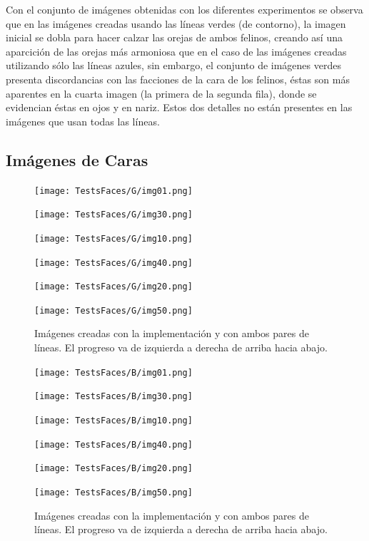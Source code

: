 \documentclass[conference]{IEEEtran}
\begin{document}
	Con el conjunto de imágenes obtenidas con los diferentes experimentos se observa que en las imágenes creadas usando las líneas verdes (de contorno), la imagen inicial se dobla para hacer calzar las orejas de ambos felinos, creando así una aparcición de las orejas más armoniosa que en el caso de las imágenes creadas utilizando sólo las líneas azules, sin embargo, el conjunto de imágenes verdes presenta discordancias con las facciones de la cara de los felinos, éstas son más aparentes en la cuarta imagen (la primera de la segunda fila), donde se evidencian éstas en ojos y en nariz. Estos dos detalles no están presentes en las imágenes que usan todas las líneas.


	\subsection*{Imágenes de Caras}
\begin{figure}[H]
\begin{multicols}{3}
    \centering
    \texttt{[image: TestsFaces/G/img01.png]} \par
    \texttt{[image: TestsFaces/G/img30.png]} \par
    
    \texttt{[image: TestsFaces/G/img10.png]} \par
    \texttt{[image: TestsFaces/G/img40.png]} \par

    \texttt{[image: TestsFaces/G/img20.png]} \par
    \texttt{[image: TestsFaces/G/img50.png]} \par
\end{multicols}
\caption{Imágenes creadas con la implementación y con ambos pares de líneas. El progreso va de izquierda a derecha de arriba hacia abajo.}
\end{figure}


\begin{figure}[H]
\begin{multicols}{3}
    \centering
    \texttt{[image: TestsFaces/B/img01.png]} \par
    \texttt{[image: TestsFaces/B/img30.png]} \par
    
    \texttt{[image: TestsFaces/B/img10.png]} \par
    \texttt{[image: TestsFaces/B/img40.png]} \par

    \texttt{[image: TestsFaces/B/img20.png]} \par
    \texttt{[image: TestsFaces/B/img50.png]} \par
\end{multicols}
\caption{Imágenes creadas con la implementación y con ambos pares de líneas. El progreso va de izquierda a derecha de arriba hacia abajo.}
\end{figure}
\end{document}
